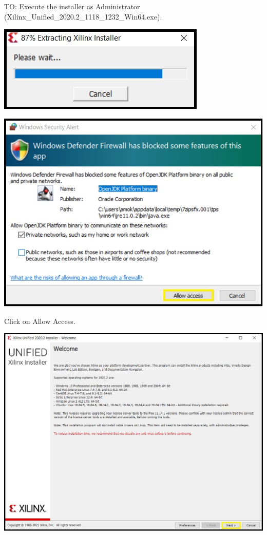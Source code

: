 TO:   Execute the installer as Administrator (Xilinx\_Unified\_2020.2\_1118\_1232\_Win64.exe).

\includegraphics[width=\linewidth]{images/VivadoInstimg006.jpg}

\includegraphics[width=\linewidth]{images/VivadoInstimg007.jpg}

Click on Allow Access.

\includegraphics[width=\linewidth]{images/VivadoInstimg008.jpg}

